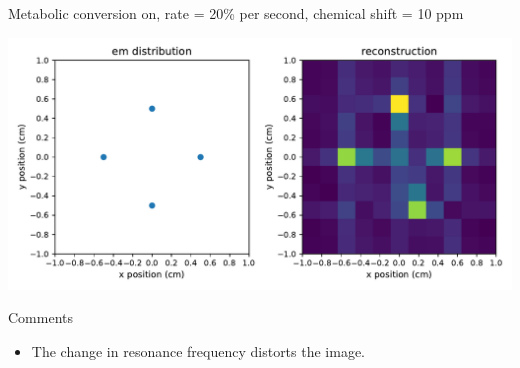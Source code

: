 \documentclass[dvipsnames]{beamer}
\begin{document}
\begin{frame}{Metabolic conversion on, rate = 20\% per second, chemical shift = 10 ppm}
\begin{center}
\includegraphics[width=\textwidth]{reconstruction_metabolism-on-20percent}
\end{center}
\end{frame}

\begin{frame}{Comments}
\begin{itemize}
\item The change in resonance frequency distorts the image.
\end{itemize}
\end{frame}
\end{document}
